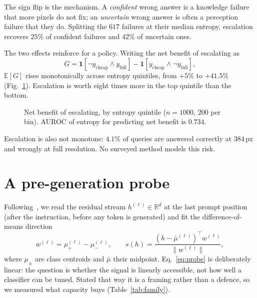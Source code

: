 \documentclass[10pt,twocolumn]{article}
\theoremstyle{plain}
\begin{document}
The sign flip is the mechanism. A \emph{confident} wrong answer is a knowledge
failure that more pixels do not fix; an \emph{uncertain} wrong answer is often
a perception failure that they do. Splitting the $617$ failures at their median
entropy, escalation recovers $25\%$ of confident failures and $42\%$ of
uncertain ones.

The two effects reinforce for a policy. Writing the net benefit of escalating as
\begin{equation}
G = \mathbf{1}[\lnot y_{\text{cheap}} \wedge y_{\text{full}}]
  - \mathbf{1}[y_{\text{cheap}} \wedge \lnot y_{\text{full}}],
\end{equation}
$\mathbb{E}[G]$ rises monotonically across entropy quintiles, from $+5\%$ to
$+41.5\%$ (Fig.~\ref{fig:quintiles}). Escalation is worth eight times more in
the top quintile than the bottom.

\begin{figure}[t]
\centering
{}
\caption{Net benefit of escalating, by entropy quintile ($n=1000$, $200$ per
bin). AUROC of entropy for predicting net benefit is $0.734$.}
\label{fig:quintiles}
\end{figure}

Escalation is also not monotone: $4.1\%$ of queries are answered correctly at
$384$\,px and wrongly at full resolution. No surveyed method models this risk.

\section{A pre-generation probe}
\label{sec:probe}

Following~\cite{lugoloobi,cencerrado}, we read the residual stream
$h^{(\ell)} \in \mathbb{R}^{d}$ at the last prompt position (after the instruction, before any token is generated) and fit the difference-of-means
direction
\begin{equation}
w^{(\ell)} = \mu^{(\ell)}_{+} - \mu^{(\ell)}_{-},
\qquad
s(h) = \frac{(h - \bar\mu^{(\ell)})^\top w^{(\ell)}}{\lVert w^{(\ell)} \rVert},
\label{eq:probe}
\end{equation}
where $\mu_{\pm}$ are class centroids and $\bar\mu$ their midpoint.
Eq.~\ref{eq:probe} is deliberately linear: the question is whether the signal is
linearly accessible, not how well a classifier can be tuned. Stated that way it
is a framing rather than a defence, so we measured what capacity buys
(Table~\ref{tab:family}).
\end{document}
